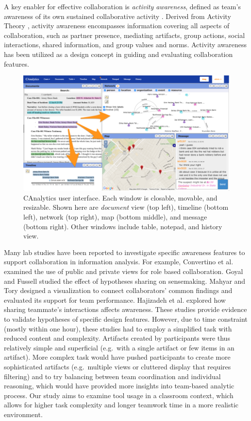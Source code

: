 A key enabler for effective collaboration is \emph{activity awareness}, defined as
team's awareness of its own sustained collaborative activity
\cite{Carroll2003,Carroll2006}. Derived from Activity Theory \cite{Leontev1974},
activity awareness encompasses information covering all aspects of collaboration, such as partner presence, mediating artifacts, group actions, social interactions, shared information, and group values and norms. Activity awareness has been utilized as a design concept in guiding and evaluating collaboration features.

\begin{figure}
\centering
\includegraphics[width=2\columnwidth]{./img/interface.png}
\caption{CAnalytics user interface. Each window is closable, movable, and resizable. Shown here are \emph{document} view (top left), timeline (bottom left), network (top right), map (bottom middle), and message (bottom right). Other windows include table, notepad, and history view. }\label{fig:canalytics}
\end{figure}

Many lab studies have been reported to investigate specific awareness features
to support collaboration in information analysis. For example, Convertino et
al. \cite{Convertino2011} examined the use of public and private views for role
based collaboration. Goyal and Fussell \cite{Goyal2016} studied the effect of
hypotheses sharing on sensemaking. Mahyar and Tory \cite{Mahyar2013b} designed a
visualization to connect collaborators' common findings and evaluated its
support for team performance. Hajizadeh et al. \cite{Hajizadeh2013} explored how
sharing teammate's interactions affects awareness. These studies provide
evidence to validate hypotheses of specific design features. However, due to
time constraint (mostly within one hour), these studies had to employ a
simplified task with reduced content and complexity. Artifacts created by
participants were thus relatively simple and superficial (e.g.~with a single
artifact or few items in an artifact). More complex task would have pushed
participants to create more sophisticated artifacts (e.g.~multiple views or
cluttered display that requires filtering) and to try balancing between team
coordination and individual reasoning, which would have provided more insights
into team-based analytic process. Our study aims to examine tool usage in a
classroom context, which allows for higher task complexity and longer teamwork
time in a more realistic environment.
